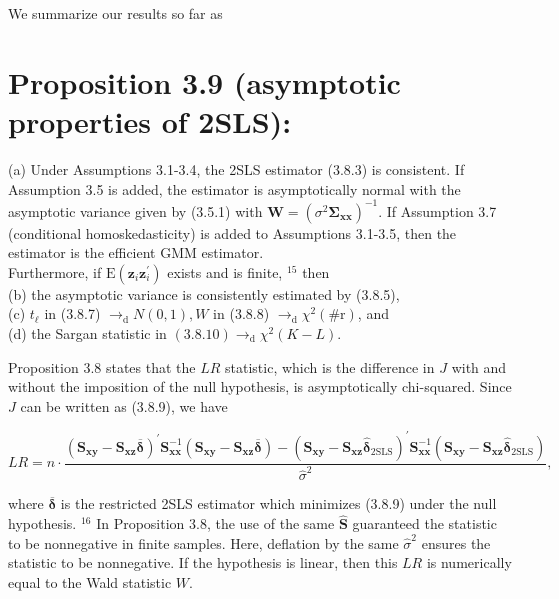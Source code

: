 \documentclass[10pt]{article}
\begin{document}
We summarize our results so far as

\section*{Proposition 3.9 (asymptotic properties of 2SLS):}
(a) Under Assumptions 3.1-3.4, the 2SLS estimator (3.8.3) is consistent. If Assumption 3.5 is added, the estimator is asymptotically normal with the asymptotic variance given by (3.5.1) with $\mathbf{W}=\left(\sigma^{2} \mathbf{\Sigma}_{\mathbf{x x}}\right)^{-1}$. If Assumption 3.7 (conditional homoskedasticity) is added to Assumptions 3.1-3.5, then the estimator is the efficient GMM estimator.\\
Furthermore, if $\mathrm{E}\left(\mathbf{z}_{i} \mathbf{z}_{i}^{\prime}\right)$ exists and is finite, ${ }^{15}$ then\\
(b) the asymptotic variance is consistently estimated by (3.8.5),\\
(c) $t_{\ell}$ in (3.8.7) $\rightarrow_{\mathrm{d}} N(0,1), W$ in (3.8.8) $\rightarrow_{\mathrm{d}} \chi^{2}(\# \mathrm{r})$, and\\
(d) the Sargan statistic in $(3.8 .10) \rightarrow_{\mathrm{d}} \chi^{2}(K-L)$.

Proposition 3.8 states that the $L R$ statistic, which is the difference in $J$ with and without the imposition of the null hypothesis, is asymptotically chi-squared. Since $J$ can be written as (3.8.9), we have


\begin{equation*}
L R=n \cdot \frac{\left(\mathbf{S}_{\mathbf{x y}}-\mathbf{S}_{\mathbf{x z}} \overline{\boldsymbol{\delta}}\right)^{\prime} \mathbf{S}_{\mathbf{x x}}^{-1}\left(\mathbf{S}_{\mathbf{x y}}-\mathbf{S}_{\mathbf{x z}} \overline{\boldsymbol{\delta}}\right)-\left(\mathbf{S}_{\mathbf{x y}}-\mathbf{S}_{\mathbf{x z}} \hat{\boldsymbol{\delta}}_{2 \mathrm{SLS}}\right)^{\prime} \mathbf{S}_{\mathbf{x x}}^{-1}\left(\mathbf{S}_{\mathbf{x y}}-\mathbf{S}_{\mathbf{x z}} \hat{\boldsymbol{\delta}}_{2 \mathrm{SLS}}\right)}{\hat{\sigma}^{2}}, \tag{3.8.11}
\end{equation*}


where $\overline{\boldsymbol{\delta}}$ is the restricted 2SLS estimator which minimizes (3.8.9) under the null hypothesis. ${ }^{16}$ In Proposition 3.8, the use of the same $\widehat{\mathbf{S}}$ guaranteed the statistic to be nonnegative in finite samples. Here, deflation by the same $\hat{\sigma}^{2}$ ensures the statistic to be nonnegative. If the hypothesis is linear, then this $L R$ is numerically equal to the Wald statistic $W$.
\end{document}

